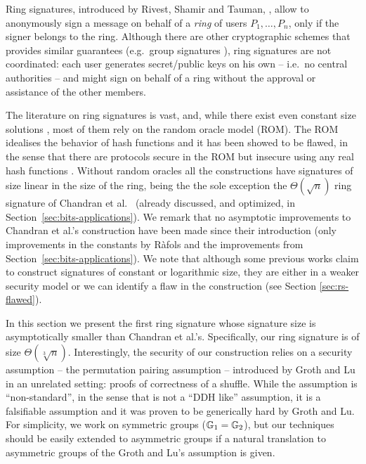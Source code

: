Ring signatures, introduced by Rivest, Shamir and Tauman, \cite{AC:RivShaTau01}, allow to anonymously sign a message on behalf of a \emph{ring} of users $P_1,\ldots,P_n$, only if the signer belongs to the ring. Although there are other cryptographic schemes that provides similar guarantees (e.g.~group signatures \cite{EC:ChaVan91}), ring signatures are not coordinated: each user generates secret/public keys on his own -- i.e.~no central authorities -- and might sign on behalf of a ring without the approval or assistance of the other members.


The literature on ring signatures is vast, and, while there exist even constant size solutions \cite{EC:DKNS04}, most of them rely on the {random oracle model} (ROM). The ROM idealises the behavior of hash functions and it has been showed to be flawed, in the sense that there are protocols secure in the ROM but insecure using any real hash functions \cite{STOC:CanGolHal98}. Without random oracles all the constructions have signatures of size linear in the size of the ring, being the the sole exception the $\Theta(\sqrt{n})$ ring signature of Chandran et al.~\cite{ICALP:ChaGroSah07} (already discussed, and optimized, in Section~\ref{sec:bits-applications}). 
We remark that no asymptotic improvements to Chandran et al.'s construction have been made since their introduction (only improvements in the constants by R\`afols \cite{TCC:Rafols15} and the improvements from Section~\ref{sec:bits-applications}). We note that although some previous works claim to construct signatures of constant \cite{ACISP:BosDasRan15} or logarithmic \cite{IET:GriSusPla16} size, they are either in a weaker security model or we can identify a flaw in the construction (see Section \ref{sec:rs-flawed}). 


In this section we present the first ring signature whose signature size is asymptotically smaller than Chandran et al.'s. Specifically, our ring signature is of size $\Theta(\sqrt[3]{n})$. Interestingly, the security of our construction relies on a security assumption -- the {permutation pairing assumption} -- introduced by Groth and Lu \cite{AC:GroLu07} in an unrelated setting: proofs of correctness of a shuffle. While the assumption is ``non-standard'', in the sense that is not a ``DDH like'' assumption, it is a falsifiable assumption and it was proven to be generically hard by Groth and Lu. For simplicity, we work on symmetric groups ($\mathbb{G}_1=\mathbb{G}_2$), but our techniques should be easily extended to asymmetric groups if a natural translation to asymmetric groups of the Groth and Lu's assumption is given.

